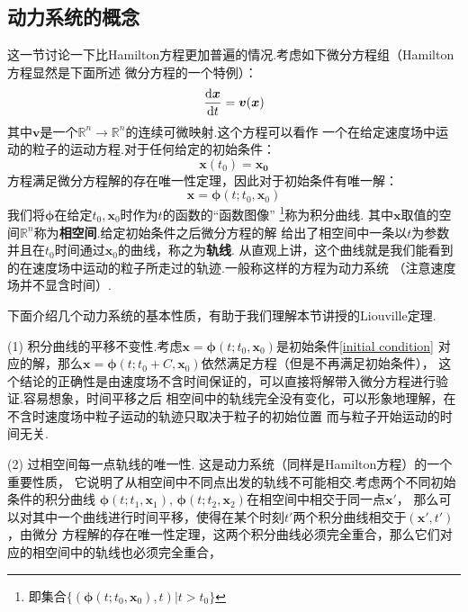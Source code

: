     \subsection{动力系统的概念}
    这一节讨论一下比Hamilton方程更加普遍的情况.考虑如下微分方程组（Hamilton方程显然是下面所述
    微分方程的一个特例）：
    \begin{equation}
        \frac{\mathrm{d}{\bm{x}}}{\mathrm{d}{t}} = \bm{v}(\bm{x})
        \label{dynamical system}
    \end{equation}
    其中$\bm{v}$是一个$\mathbb{R}^{n}\to\mathbb{R}^{n}$的连续可微映射.这个方程可以看作
    一个在给定速度场中运动的粒子的运动方程.对于任何给定的初始条件：
    \begin{equation}
        \bm{x}(t_0) = \bm{x_0}
        \label{initial condition}
    \end{equation}
    方程满足微分方程解的存在唯一性定理\cite{丁同仁2004常微分方程教程}，因此对于初始条件有唯一解：
    \begin{equation}
        \bm{x} = \bm{\phi}(t;t_0, \bm{x}_0)
    \end{equation}
    我们将$\bm{\phi}$在给定$t_0,\bm{x}_0$时作为$t$的函数的“函数图像”
    \footnote{即集合$\{(\bm{\phi}(t;t_0,\bm{x}_0), t)|t>t_0\}$}称为积分曲线.
    其中$\bm{x}$取值的空间$\mathbb{R}^n$称为\textbf{相空间}.给定初始条件之后微分方程的解
    给出了相空间中一条以$t$为参数并且在$t_0$时间通过$\bm{x}_0$的曲线，称之为\textbf{轨线}.
    从直观上讲，这个曲线就是我们能看到的在速度场中运动的粒子所走过的轨迹.一般称这样的方程为动力系统
    （注意速度场并不显含时间）.
    \par 下面介绍几个动力系统的基本性质，有助于我们理解本节讲授的Liouville定理.
    \par (1) 积分曲线的平移不变性.考虑$\bm{x} = \bm{\phi}(t;t_0,\bm{x}_0)$是初始条件\ref{initial condition}
    对应的解，那么$\bm{x} = \bm{\phi}(t;t_0 + C,\bm{x}_0)$依然满足方程（但是不再满足初始条件），
    这个结论的正确性是由速度场不含时间保证的，可以直接将解带入微分方程进行验证.容易想象，时间平移之后
    相空间中的轨线完全没有变化，可以形象地理解，在不含时速度场中粒子运动的轨迹只取决于粒子的初始位置
    而与粒子开始运动的时间无关.
    \par (2) 过相空间每一点轨线的唯一性. 这是动力系统（同样是Hamilton方程）的一个重要性质，
    它说明了从相空间中不同点出发的轨线不可能相交.考虑两个不同初始条件的积分曲线
    $\bm{\phi}(t;t_1,\bm{x}_1),\, \bm{\phi}(t; t_2, \bm{x}_2)$在相空间中相交于同一点$\bm{x}'$，
    那么可以对其中一个曲线进行时间平移，使得在某个时刻$t'$两个积分曲线相交于$(\bm{x}', t')$，由微分
    方程解的存在唯一性定理，这两个积分曲线必须完全重合，那么它们对应的相空间中的轨线也必须完全重合，
